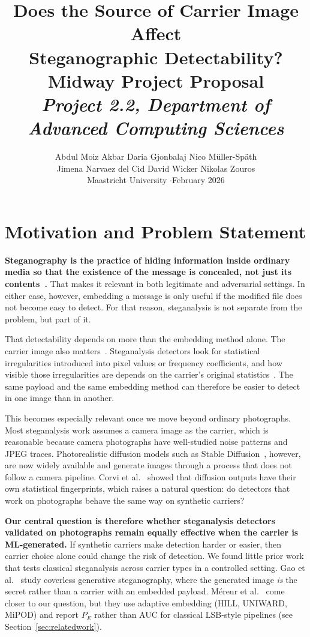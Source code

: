 \documentclass[10pt,twocolumn,a4paper]{article}
\title{\vspace{-1.2cm}\textbf{Does the Source of Carrier Image Affect\\
Steganographic Detectability?}\\[4pt]
\large Midway Project Proposal\\[6pt]
\normalsize\textit{Project 2.2, Department of Advanced Computing Sciences}}
\author{Abdul Moiz Akbar \quad Daria Gjonbalaj \quad Nico Müller-Späth\\[2pt]
Jimena Narvaez del Cid \quad David Wicker \quad Nikolas Zouros\\[2pt]
\small Maastricht University \quad$\cdot$\quad February 2026}
\date{}
\begin{document}
\maketitle
\thispagestyle{fancy}
\vspace{-0.6cm}

\section{Motivation and Problem Statement}

\textbf{Steganography is the practice of hiding information inside ordinary media so that the existence of the message is concealed, not just its contents~\cite{petitcolas1999,cheddad2010}.} That makes it relevant in both legitimate and adversarial settings. In either case, however, embedding a message is only useful if the modified file does not become easy to detect. For that reason, steganalysis is not separate from the problem, but part of it.

That detectability depends on more than the embedding method alone. The carrier image also matters~\cite{petitcolas1999,cheddad2010}. Steganalysis detectors look for statistical irregularities introduced into pixel values or frequency coefficients, and how visible those irregularities are depends on the carrier's original statistics~\cite{giboulot2020csm,fridrich2001lsb}. The same payload and the same embedding method can therefore be easier to detect in one image than in another.

This becomes especially relevant once we move beyond ordinary photographs. Most steganalysis work assumes a camera image as the carrier, which is reasonable because camera photographs have well-studied noise patterns and JPEG traces. Photorealistic diffusion models such as Stable Diffusion~\cite{rombach2022sd}, however, are now widely available and generate images through a process that does not follow a camera pipeline. Corvi et al.~\cite{corvi2023diffusion} showed that diffusion outputs have their own statistical fingerprints, which raises a natural question: do detectors that work on photographs behave the same way on synthetic carriers?

\textbf{Our central question is therefore whether steganalysis detectors validated on photographs remain equally effective when the carrier is ML-generated.} If synthetic carriers make detection harder or easier, then carrier choice alone could change the risk of detection. We found little prior work that tests classical steganalysis across carrier types in a controlled setting. Gao et al.~\cite{gao2022ai} study coverless generative steganography, where the generated image \emph{is} the secret rather than a carrier with an embedded payload. M\'{e}reur et al.~\cite{mereur2024deepfake} come closer to our question, but they use adaptive embedding (HILL, UNIWARD, MiPOD) and report $P_E$ rather than AUC for classical LSB-style pipelines (see Section~\ref{sec:relatedwork}).
\end{document}
